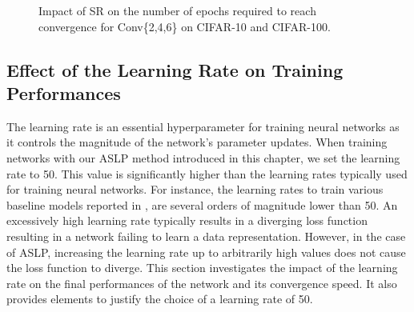 \begin{figure}[htbp]
  \centering
  \caption{Impact of \acf{SR} on the number of epochs required to reach
    convergence for Conv\{2,4,6\} on CIFAR-10 and CIFAR-100.}
  \label{fig:chap2:rescale_impact}
\end{figure}

\subsection{Effect of the Learning Rate on Training Performances}
\label{sec:chap2:impact_learning_rate}

The learning rate is an essential hyperparameter for training neural networks as
it controls the magnitude of the network's parameter updates. When training
networks with our \ac{ASLP} method introduced in this chapter, we set the
learning rate to 50. This value is significantly higher than the learning rates
typically used for training neural networks. For instance, the learning rates to
train various baseline models reported in \cite{nvidia-baselines}, are several
orders of magnitude lower than 50. An excessively high learning rate typically
results in a diverging loss function resulting in a network failing to learn a
data representation. However, in the case of \ac{ASLP}, increasing the learning
rate up to arbitrarily high values does not cause the loss function to diverge.
This section investigates the impact of the learning rate on the final
performances of the network and its convergence speed. It also provides elements
to justify the choice of a learning rate of 50.\\

